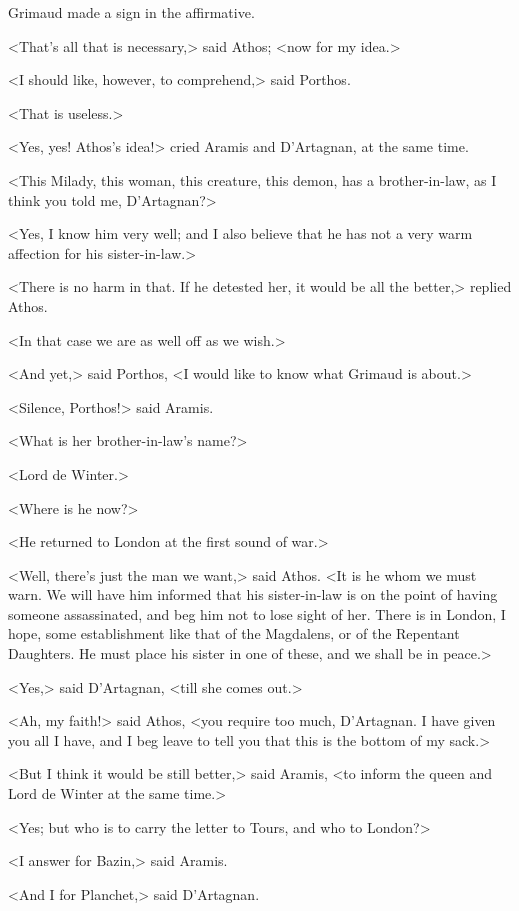 Grimaud made a sign in the affirmative. 

<That's all that is necessary,> said Athos; <now for my idea.> 

<I should like, however, to comprehend,> said Porthos. 

<That is useless.> 

<Yes, yes! Athos's idea!> cried Aramis and D'Artagnan, at the same time. 

<This Milady, this woman, this creature, this demon, has a brother-in-law, as I think you told me, D'Artagnan?> 

<Yes, I know him very well; and I also believe that he has not a very warm affection for his sister-in-law.> 

<There is no harm in that. If he detested her, it would be all the better,> replied Athos. 

<In that case we are as well off as we wish.> 

<And yet,> said Porthos, <I would like to know what Grimaud is about.> 

<Silence, Porthos!> said Aramis. 

<What is her brother-in-law's name?> 

<Lord de Winter.> 

<Where is he now?> 

<He returned to London at the first sound of war.> 

<Well, there's just the man we want,> said Athos. <It is he whom we must warn. We will have him informed that his sister-in-law is on the point of having someone assassinated, and beg him not to lose sight of her. There is in London, I hope, some establishment like that of the Magdalens, or of the Repentant Daughters. He must place his sister in one of these, and we shall be in peace.> 

<Yes,> said D'Artagnan, <till she comes out.> 

<Ah, my faith!> said Athos, <you require too much, D'Artagnan. I have given you all I have, and I beg leave to tell you that this is the bottom of my sack.> 

<But I think it would be still better,> said Aramis, <to inform the queen and Lord de Winter at the same time.> 

<Yes; but who is to carry the letter to Tours, and who to London?> 

<I answer for Bazin,> said Aramis. 

<And I for Planchet,> said D'Artagnan. 

